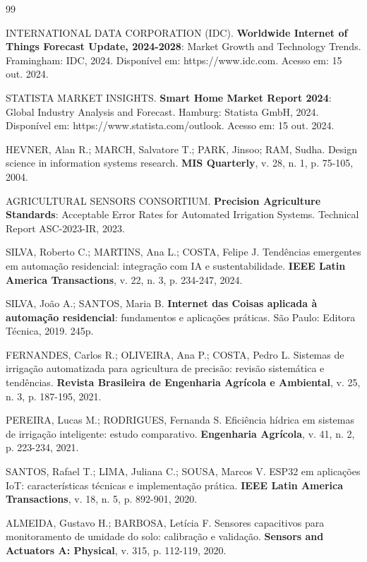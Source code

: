 
\begin{thebibliography}{99}

INTERNATIONAL DATA CORPORATION (IDC). \textbf{Worldwide Internet of Things Forecast Update, 2024-2028}: Market Growth and Technology Trends. Framingham: IDC, 2024. Disponível em: https://www.idc.com. Acesso em: 15 out. 2024.

STATISTA MARKET INSIGHTS. \textbf{Smart Home Market Report 2024}: Global Industry Analysis and Forecast. Hamburg: Statista GmbH, 2024. Disponível em: https://www.statista.com/outlook. Acesso em: 15 out. 2024.

HEVNER, Alan R.; MARCH, Salvatore T.; PARK, Jinsoo; RAM, Sudha. Design science in information systems research. \textbf{MIS Quarterly}, v. 28, n. 1, p. 75-105, 2004.

AGRICULTURAL SENSORS CONSORTIUM. \textbf{Precision Agriculture Standards}: Acceptable Error Rates for Automated Irrigation Systems. Technical Report ASC-2023-IR, 2023.

SILVA, Roberto C.; MARTINS, Ana L.; COSTA, Felipe J. Tendências emergentes em automação residencial: integração com IA e sustentabilidade. \textbf{IEEE Latin America Transactions}, v. 22, n. 3, p. 234-247, 2024.

SILVA, João A.; SANTOS, Maria B. \textbf{Internet das Coisas aplicada à automação residencial}: fundamentos e aplicações práticas. São Paulo: Editora Técnica, 2019. 245p.

FERNANDES, Carlos R.; OLIVEIRA, Ana P.; COSTA, Pedro L. Sistemas de irrigação automatizada para agricultura de precisão: revisão sistemática e tendências. \textbf{Revista Brasileira de Engenharia Agrícola e Ambiental}, v. 25, n. 3, p. 187-195, 2021.

PEREIRA, Lucas M.; RODRIGUES, Fernanda S. Eficiência hídrica em sistemas de irrigação inteligente: estudo comparativo. \textbf{Engenharia Agrícola}, v. 41, n. 2, p. 223-234, 2021.

SANTOS, Rafael T.; LIMA, Juliana C.; SOUSA, Marcos V. ESP32 em aplicações IoT: características técnicas e implementação prática. \textbf{IEEE Latin America Transactions}, v. 18, n. 5, p. 892-901, 2020.

ALMEIDA, Gustavo H.; BARBOSA, Letícia F. Sensores capacitivos para monitoramento de umidade do solo: calibração e validação. \textbf{Sensors and Actuators A: Physical}, v. 315, p. 112-119, 2020.


\end{thebibliography}
